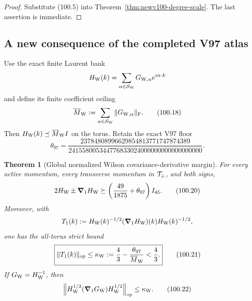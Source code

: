 \documentclass[11pt,oneside]{article}
\newtheorem{theorem}{Theorem}[section]
\theoremstyle{definition}
\theoremstyle{remark}
\begin{document}
\begin{proof}
Substitute (100.5) into
Theorem~\ref{thm:newv100-degree-scale}.  The last assertion is
immediate.
\end{proof}

\subsection{A new consequence of the completed V97 atlas}

Use the exact finite Laurent bank
\[
 H_{\rm W}(k)=
 \sum_{\alpha\in{\cal S}_{\rm W}}
 G_{{\rm W},\alpha}e^{i\alpha\cdot k}
\]
and define its finite coefficient ceiling
\[
 \overline M_{\rm W}:=
 \sum_{\alpha\in{\cal S}_{\rm W}}
 \|G_{{\rm W},\alpha}\|_{\rm F}.                     \tag{100.18}
\]
Then \(H_{\rm W}(k)\preceq\overline M_{\rm W}I\) on the
torus.  Retain the exact V97 floor
\[
 \theta_{97}=
 \frac{23784808996629854813771747874389}
 {241558005344776833024000000000000000000}.          \tag{100.19}
\]

\begin{theorem}[Global normalized Wilson covariance-derivative margin]
\label{thm:newv100-normalized-margin}
For every active momentum, every transverse momentum in
\({\cal T}_\perp\), and both signs,
\[
 2H_{\rm W}\pm{\boldsymbol\nabla}_1H_{\rm W}
 \succeq
 \left(\frac{49}{1875}+\theta_{97}\right)I_{45}.
                                                               \tag{100.20}
\]
Moreover, with
\[
 T_1(k):=
 H_{\rm W}(k)^{-1/2}
 ({\boldsymbol\nabla}_1H_{\rm W})(k)
 H_{\rm W}(k)^{-1/2},
\]
one has the all-torus strict bound
\[
 \boxed{
 \|T_1(k)\|_{\rm op}
 \le\kappa_{\rm W}:=
 \frac43-\frac{\theta_{97}}{\overline M_{\rm W}}
 <\frac43.}                                           \tag{100.21}
\]
If \(G_{\rm W}=H_{\rm W}^{-1}\), then
\[
 \left\|
 H_{\rm W}^{1/2}
 ({\boldsymbol\nabla}_1G_{\rm W})
 H_{\rm W}^{1/2}
 \right\|_{\rm op}
 \le\kappa_{\rm W}.                                  \tag{100.22}
\]
\end{theorem}
\end{document}
